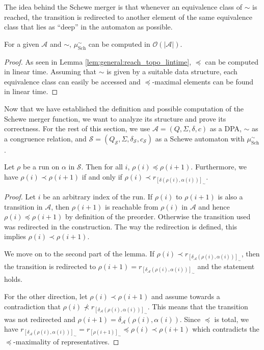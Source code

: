 The idea behind the Schewe merger is that whenever an equivalence class of $\sim$ is reached, the transition is redirected to another element of the same equivalence class that lies as \enquote{deep} in the automaton as possible.

\begin{lem}
\label{lem:schewe:schewe_aut_linear_time}
	For a given $\mathcal{A}$ and $\sim$, $\mu_\text{Sch}^\sim$ can be computed in $\mathcal{O}(|\mathcal{A}|)$.
\end{lem}

\begin{proof}
	As seen in Lemma \ref{lem:general:reach_topo_lintime}, $\preceq$ can be computed in linear time. Assuming that $\sim$ is given by a suitable data structure, each equivalence class can easily be accessed and $\preceq$-maximal elements can be found in linear time.
\end{proof}

\vspace{10pt}

Now that we have established the definition and possible computation of the Schewe merger function, we want to analyze its structure and prove its correctness. For the rest of this section, we use $\mathcal{A} = (Q, \Sigma, \delta, c)$ as a DPA, $\sim$ as a congruence relation, and $\mathcal{S} = (Q_\mathcal{S}, \Sigma, \delta_\mathcal{S}, c_\mathcal{S})$ as a Schewe automaton with $\mu_\text{Sch}^\sim$.

\begin{lem}
\label{lem:schewe:run_growing}
	Let $\rho$ be a run on $\alpha$ in $\mathcal{S}$. Then for all $i$, $\rho(i) \preceq \rho(i+1)$.
	Furthermore, we have $\rho(i) \prec \rho(i+1)$ if and only if $\rho(i) \prec r_{[\delta(\rho(i), \alpha(i))]_\sim}$.
\end{lem}

\begin{proof}
	Let $i$ be an arbitrary index of the run. If $\rho(i)$ to $\rho(i+1)$ is also a transition in $\mathcal{A}$, then $\rho(i+1)$ is reachable from $\rho(i)$ in $\mathcal{A}$ and hence $\rho(i) \preceq \rho(i+1)$ by definition of the preorder. Otherwise the transition used was redirected in the construction. The way the redirection is defined, this implies $\rho(i) \prec \rho(i+1)$.
	
	We move on to the second part of the lemma. If $\rho(i) \prec r_{[\delta_\mathcal{A}(\rho(i), \alpha(i))]_\sim}$, then the transition is redirected to $\rho(i+1) = r_{[\delta_\mathcal{A}(\rho(i), \alpha(i))]_\sim}$ and the statement holds. 
	
	For the other direction, let $\rho(i) \prec \rho(i+1)$ and assume towards a contradiction that $\rho(i) \not\prec r_{[\delta_\mathcal{A}(\rho(i), \alpha(i))]_\sim}$. This means that the transition was not redirected and $\rho(i+1) = \delta_\mathcal{A}(\rho(i), \alpha(i))$. Since $\preceq$ is total, we have $r_{[\delta_\mathcal{A}(\rho(i), \alpha(i))]_\sim} = r_{[\rho(i+1)]_\sim} \preceq \rho(i) \prec \rho(i+1)$ which contradicts the $\preceq$-maximality of representatives.
\end{proof}

